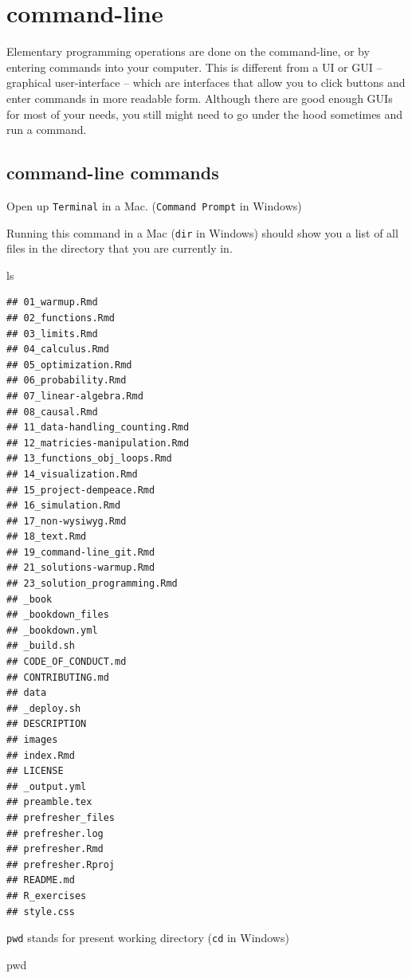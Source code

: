 \documentclass[]{book}
\newenvironment{Shaded}{\begin{snugshade}}{\end{snugshade}}
\newcommand{\FunctionTok}[1]{\textcolor[rgb]{0.00,0.00,0.00}{#1}}
\newcommand{\BuiltInTok}[1]{#1}
\theoremstyle{definition}
\theoremstyle{definition}
\theoremstyle{definition}
\theoremstyle{remark}
\begin{document}
\section{command-line}\label{command-line}

Elementary programming operations are done on the command-line, or by
entering commands into your computer. This is different from a UI or GUI
-- graphical user-interface -- which are interfaces that allow you to
click buttons and enter commands in more readable form. Although there
are good enough GUIs for most of your needs, you still might need to go
under the hood sometimes and run a command.

\subsection{command-line commands}\label{command-line-commands}

Open up \texttt{Terminal} in a Mac. (\texttt{Command\ Prompt} in
Windows)

Running this command in a Mac (\texttt{dir} in Windows) should show you
a list of all files in the directory that you are currently in.

\begin{Shaded}
\begin{Highlighting}[]
\FunctionTok{ls}
\end{Highlighting}
\end{Shaded}

\begin{verbatim}
## 01_warmup.Rmd
## 02_functions.Rmd
## 03_limits.Rmd
## 04_calculus.Rmd
## 05_optimization.Rmd
## 06_probability.Rmd
## 07_linear-algebra.Rmd
## 08_causal.Rmd
## 11_data-handling_counting.Rmd
## 12_matricies-manipulation.Rmd
## 13_functions_obj_loops.Rmd
## 14_visualization.Rmd
## 15_project-dempeace.Rmd
## 16_simulation.Rmd
## 17_non-wysiwyg.Rmd
## 18_text.Rmd
## 19_command-line_git.Rmd
## 21_solutions-warmup.Rmd
## 23_solution_programming.Rmd
## _book
## _bookdown_files
## _bookdown.yml
## _build.sh
## CODE_OF_CONDUCT.md
## CONTRIBUTING.md
## data
## _deploy.sh
## DESCRIPTION
## images
## index.Rmd
## LICENSE
## _output.yml
## preamble.tex
## prefresher_files
## prefresher.log
## prefresher.Rmd
## prefresher.Rproj
## README.md
## R_exercises
## style.css
\end{verbatim}

\texttt{pwd} stands for present working directory (\texttt{cd} in
Windows)

\begin{Shaded}
\begin{Highlighting}[]
\BuiltInTok{pwd}
\end{Highlighting}
\end{Shaded}
\end{document}
